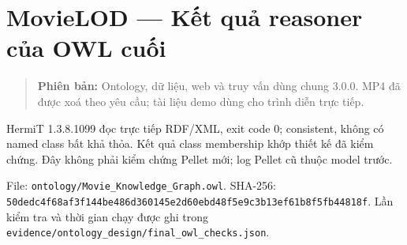 \documentclass[
  11pt,
]{article}
\author{}
\date{}
\begin{document}
\section{MovieLOD --- Kết quả reasoner của OWL
cuối}\label{movielod-kux1ebft-quux1ea3-reasoner-cux1ee7a-owl-cuux1ed1i}

\begin{quote}
\textbf{Phiên bản:} Ontology, dữ liệu, web và truy vấn dùng chung 3.0.0.
MP4 đã được xoá theo yêu cầu; tài liệu demo dùng cho trình diễn trực
tiếp.
\end{quote}

HermiT 1.3.8.1099 đọc trực tiếp RDF/XML, exit code 0; consistent, không
có named class bất khả thỏa. Kết quả class membership khớp thiết kế đã
kiểm chứng. Đây không phải kiểm chứng Pellet mới; log Pellet cũ thuộc
model trước.

File:
\texttt{ontology\allowbreak{}/\allowbreak{}\allowbreak{}Movie\_\allowbreak{}\allowbreak{}K\allowbreak{}nowledge\allowbreak{}\_\allowbreak{}\allowbreak{}Graph.\allowbreak{}o\allowbreak{}wl}.
SHA-256:
\texttt{50dedc4f\allowbreak{}68af3f14\allowbreak{}4be486d3\allowbreak{}60145e2d\allowbreak{}60ebd48f\allowbreak{}5e9c3b13\allowbreak{}ef61b8f5\allowbreak{}fb44818f\allowbreak{}}.
Lần kiểm tra và thời gian chạy được ghi trong
\texttt{evidence\allowbreak{}/\allowbreak{}ontolog\allowbreak{}y\_\allowbreak{}design\allowbreak{}/\allowbreak{}final\_\allowbreak{}o\allowbreak{}wl\_\allowbreak{}check\allowbreak{}s.\allowbreak{}json}.
\end{document}
